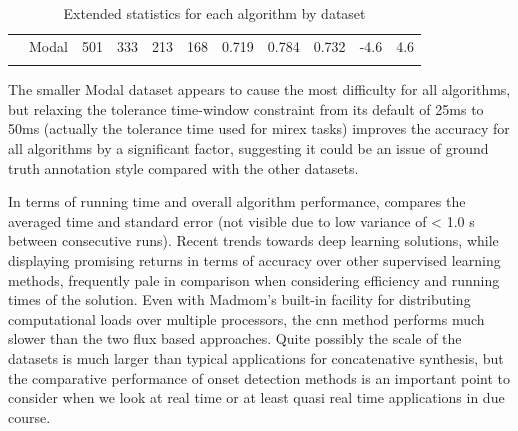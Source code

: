 {\begin{table}
\begin{threeparttable}
\begin{centering}
\begin{tabular}{l l l l l l l l l l l}
          & Modal   & 501    & 333   & 213  & 168   & 0.719     & 0.784  & 0.732     & -4.6 & 4.6 \\
				\tablebot		
			\end{tabular}
			\par \end{centering}		
		\begin{tablenotes}
			\small
		\end{tablenotes}
			\caption[Extended statistics for each algorithm by dataset]{Extended statistics for each algorithm by dataset}
			\label{tab:extended_onset_statistics}
	\end{threeparttable}
\end{table}

The smaller Modal dataset appears to cause the most difficulty for all algorithms, but relaxing the tolerance time-window constraint from its default of 25ms to 50ms (actually the tolerance time used for \acrshort{mirex} tasks) improves the accuracy for all algorithms by a significant factor, suggesting it could be an issue of ground truth annotation style compared with the other datasets.

In terms of running time and overall algorithm performance,  compares the averaged time and standard error (not visible due to low variance of < 1.0 s between consecutive runs). Recent trends towards deep learning solutions, while displaying promising returns in terms of accuracy over other supervised learning methods, frequently pale in comparison when considering efficiency and running times of the solution. Even with Madmom's built-in facility for distributing computational loads over multiple processors, the \acrshort{cnn} method performs much slower than the two flux based approaches. Quite possibly the scale of the datasets is much larger than typical applications for concatenative synthesis, but the comparative performance of onset detection methods is an important point to consider when we look at real time or at least quasi real time applications in due course.

}
